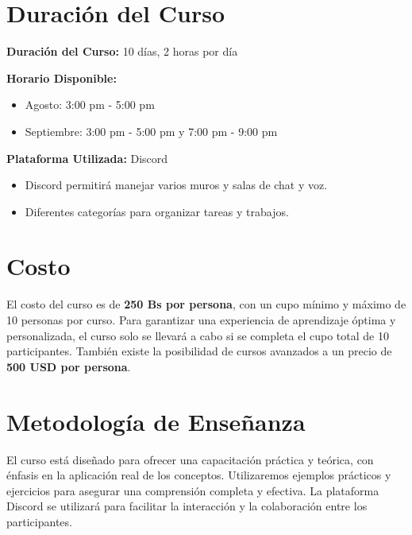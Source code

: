 \documentclass[a4paper,12pt]{article}
\begin{document}
\vspace{1em}

\newpage

\section*{Duración del Curso}

\textbf{Duración del Curso:} 10 días, 2 horas por día

\textbf{Horario Disponible:}
\begin{itemize}
    \item Agosto: 3:00 pm - 5:00 pm
    \item Septiembre: 3:00 pm - 5:00 pm y 7:00 pm - 9:00 pm
\end{itemize}

\textbf{Plataforma Utilizada:} Discord
\begin{itemize}
    \item Discord permitirá manejar varios muros y salas de chat y voz.
    \item Diferentes categorías para organizar tareas y trabajos.
\end{itemize}

\vspace{1em}

\section*{Costo}

El costo del curso es de \textbf{250 Bs por persona}, con un cupo mínimo y máximo de 10 personas por curso. Para garantizar una experiencia de aprendizaje óptima y personalizada, el curso solo se llevará a cabo si se completa el cupo total de 10 participantes. También existe la posibilidad de cursos avanzados a un precio de \textbf{500 USD por persona}.

\vspace{1em}

\section*{Metodología de Enseñanza}

El curso está diseñado para ofrecer una capacitación práctica y teórica, con énfasis en la aplicación real de los conceptos. Utilizaremos ejemplos prácticos y ejercicios para asegurar una comprensión completa y efectiva. La plataforma Discord se utilizará para facilitar la interacción y la colaboración entre los participantes.
\end{document}
